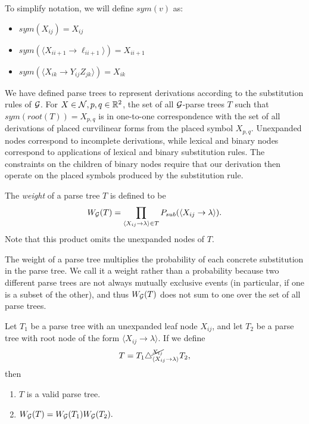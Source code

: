 To simplify notation, we will define $sym(v)$ as:
\begin{itemize}
\item $sym(X_{ij}) = X_{ij}$
\item $sym(\langle X_{i i+1} \to \ell_{i i+1}\rangle) = X_{i i+1}$
\item $sym(\langle X_{ik} \to Y_{ij} Z_{jk}\rangle) = X_{i k}$
\end{itemize}

We have defined parse trees to represent derivations according to the
substitution rules of ${\mathcal G}$.  For $X\in {\mathcal N}, p,q\in \mathbb{R}^2$, the set
of all ${\mathcal G}$-parse trees $T$ such that $sym(root(T)) = X_{p,q}$ is in
one-to-one correspondence with the set of all derivations of placed
curvilinear forms from the placed symbol $X_{p,q}$. Unexpanded nodes
correspond to incomplete derivations, while lexical and binary nodes
correspond to applications of lexical and binary substitution
rules. The constraints on the children of binary nodes require that
our derivation then operate on the placed symbols produced by the
substitution rule.

\begin{defn}
The \emph{weight} of a parse tree $T$ is defined to be
$$ W_{{\mathcal G}}(T) = \prod_{\langle X_{ij} \to \lambda \rangle\in T} P_{sub}(
\langle X_{ij} \to \lambda \rangle).$$ Note that this product omits
the unexpanded nodes of $T$.
\end{defn}

The weight of a parse tree multiplies the probability of each concrete
substitution in the parse tree.  We call it a weight rather than a
probability because two different parse trees are not always mutually
exclusive events (in particular, if one is a subset of the other), and
thus $W_{{\mathcal G}}(T)$ does not sum to one over the set of all parse trees.

\begin{obs}
Let $T_1$ be a parse tree with an unexpanded leaf node $X_{ij}$, and let
$T_2$ be a parse tree with root node of the form $\langle X_{ij} \to
\lambda \rangle$. If we define
$$T = T_1 \triangle^{\cancel{X_{ij}}}_{\langle X_{ij} \to \lambda
  \rangle} T_2,$$
then
\begin{enumerate}
\item $T$ is a valid parse tree.
\item $W_{{\mathcal G}}(T) = W_{{\mathcal G}}(T_1) W_{{\mathcal G}}(T_2).$
\end{enumerate}
\end{obs}

